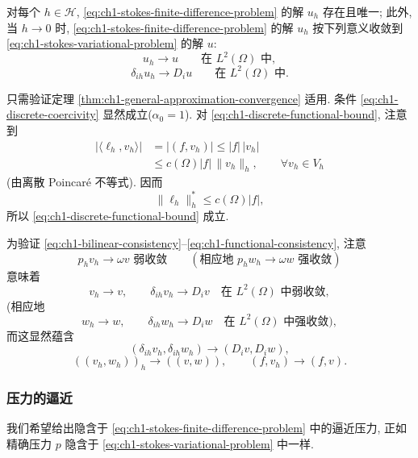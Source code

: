 \begin{Proposition}
\label{prop:ch1-stokes-finite-difference-convergence}
对每个 $h\in\mathcal H$, \eqref{eq:ch1-stokes-finite-difference-problem} 的解 $u_h$ 存在且唯一; 此外, 当 $h\to0$ 时, \eqref{eq:ch1-stokes-finite-difference-problem} 的解 $u_h$ 按下列意义收敛到 \eqref{eq:ch1-stokes-variational-problem} 的解 $u$:
\begin{equation}
u_h\to u\qquad\text{在 }L^2(\Omega)\text{ 中},
\label{eq:ch1-stokes-discrete-velocity-convergence}
\end{equation}
\begin{equation}
\delta_{ih}u_h\to D_iu\qquad\text{在 }L^2(\Omega)\text{ 中}.
\label{eq:ch1-stokes-discrete-derivative-convergence}
\end{equation}
\end{Proposition}

\begin{Proof}
只需验证定理 \ref{thm:ch1-general-approximation-convergence} 适用. 条件 \eqref{eq:ch1-discrete-coercivity} 显然成立($\alpha_0=1$). 对 \eqref{eq:ch1-discrete-functional-bound}, 注意到
\[
\begin{aligned}
|\langle\ell_h,v_h\rangle|
&=|(f,v_h)|\leq|f|\,|v_h|\\
&\leq c(\Omega)|f|\,\|v_h\|_h,\qquad\forall v_h\in V_h
\end{aligned}
\]
(由离散 Poincaré 不等式). 因而
\begin{equation}
\|\ell_h\|_h^\ast\leq c(\Omega)|f|,
\label{eq:ch1-stokes-discrete-functional-bound}
\end{equation}
所以 \eqref{eq:ch1-discrete-functional-bound} 成立.

为验证 \eqref{eq:ch1-bilinear-consistency}--\eqref{eq:ch1-functional-consistency}, 注意
\[
p_hv_h\to\omega v\text{ 弱收敛}
\qquad
(\text{相应地 }p_hw_h\to\omega w\text{ 强收敛})
\]
意味着
\[
v_h\to v,\qquad\delta_{ih}v_h\to D_iv
\quad\text{在 }L^2(\Omega)\text{ 中弱收敛},
\]
(相应地
\[
w_h\to w,\qquad\delta_{ih}w_h\to D_iw
\quad\text{在 }L^2(\Omega)\text{ 中强收敛}),
\]
而这显然蕴含
\[
(\delta_{ih}v_h,\delta_{ih}w_h)\to(D_iv,D_iw),
\]
\[
((v_h,w_h))_h\to((v,w)),
\qquad
(f,v_h)\to(f,v).
\]
\end{Proof}

\subsubsection*{压力的逼近}

我们希望给出隐含于 \eqref{eq:ch1-stokes-finite-difference-problem} 中的逼近压力, 正如精确压力 $p$ 隐含于 \eqref{eq:ch1-stokes-variational-problem} 中一样.

